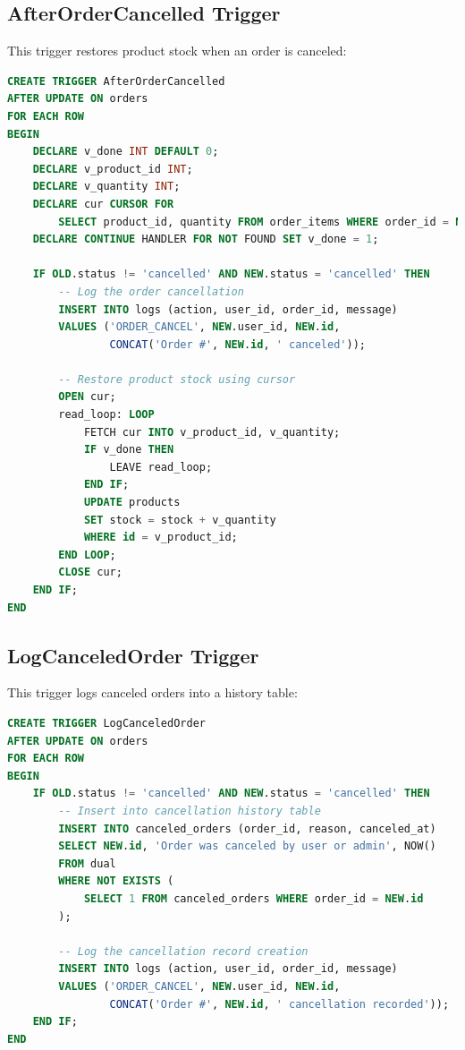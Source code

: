 \documentclass[14pt,a4paper]{article}
\begin{document}
\subsection{AfterOrderCancelled Trigger}
This trigger restores product stock when an order is canceled:

\begin{lstlisting}[language=SQL]
CREATE TRIGGER AfterOrderCancelled
AFTER UPDATE ON orders
FOR EACH ROW
BEGIN
    DECLARE v_done INT DEFAULT 0;
    DECLARE v_product_id INT;
    DECLARE v_quantity INT;
    DECLARE cur CURSOR FOR 
        SELECT product_id, quantity FROM order_items WHERE order_id = NEW.id;
    DECLARE CONTINUE HANDLER FOR NOT FOUND SET v_done = 1;

    IF OLD.status != 'cancelled' AND NEW.status = 'cancelled' THEN
        -- Log the order cancellation
        INSERT INTO logs (action, user_id, order_id, message)
        VALUES ('ORDER_CANCEL', NEW.user_id, NEW.id, 
                CONCAT('Order #', NEW.id, ' canceled'));
        
        -- Restore product stock using cursor
        OPEN cur;
        read_loop: LOOP
            FETCH cur INTO v_product_id, v_quantity;
            IF v_done THEN
                LEAVE read_loop;
            END IF;
            UPDATE products
            SET stock = stock + v_quantity
            WHERE id = v_product_id;
        END LOOP;
        CLOSE cur;
    END IF;
END
\end{lstlisting}

\subsection{LogCanceledOrder Trigger}
This trigger logs canceled orders into a history table:

\begin{lstlisting}[language=SQL]
CREATE TRIGGER LogCanceledOrder
AFTER UPDATE ON orders
FOR EACH ROW
BEGIN
    IF OLD.status != 'cancelled' AND NEW.status = 'cancelled' THEN
        -- Insert into cancellation history table
        INSERT INTO canceled_orders (order_id, reason, canceled_at)
        SELECT NEW.id, 'Order was canceled by user or admin', NOW()
        FROM dual
        WHERE NOT EXISTS (
            SELECT 1 FROM canceled_orders WHERE order_id = NEW.id
        );
        
        -- Log the cancellation record creation
        INSERT INTO logs (action, user_id, order_id, message)
        VALUES ('ORDER_CANCEL', NEW.user_id, NEW.id, 
                CONCAT('Order #', NEW.id, ' cancellation recorded'));
    END IF;
END
\end{lstlisting}
\end{document}
